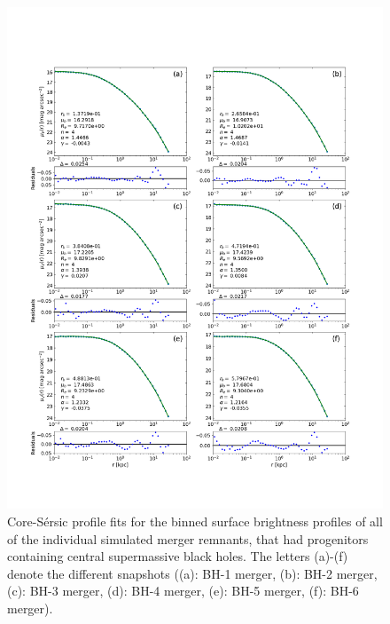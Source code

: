 \documentclass[english, twoside]{HYgradu}
\begin{document}
\begin{figure}
	\centering
	\includegraphics[width=\textwidth]{all_core_profiles.png}
	\caption{Core-Sérsic profile fits for the binned surface brightness profiles of all of the individual simulated merger remnants, that had progenitors containing central supermassive black holes. The letters (a)-(f) denote the different snapshots ((a): BH-1 merger, (b): BH-2 merger, (c): BH-3 merger, (d): BH-4 merger, (e): BH-5 merger, (f): BH-6 merger).}
	\label{figure:all_core}
\end{figure}
\end{document}
